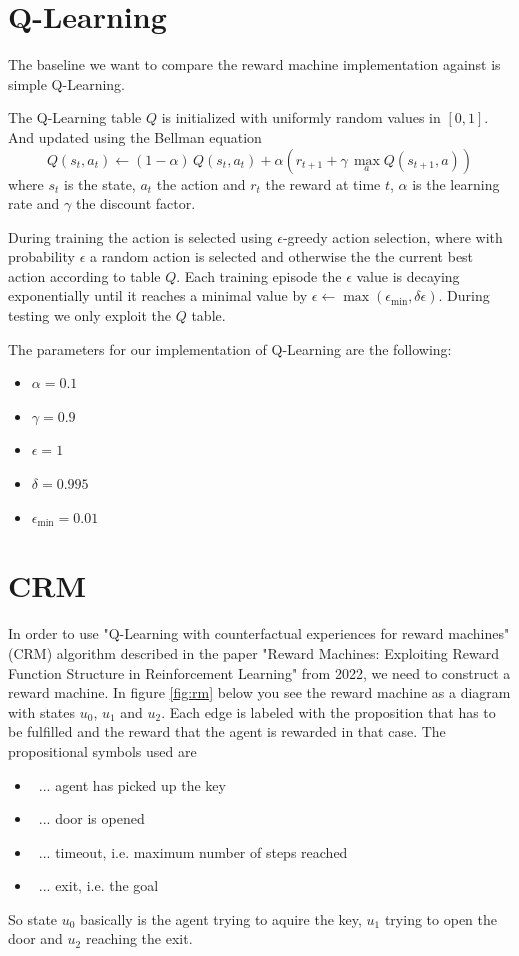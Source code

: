 \documentclass[12pt, a4paper]{article}
\begin{document}
\section*{Q-Learning}

The baseline we want to compare the reward machine implementation against is simple Q-Learning.

The Q-Learning table $Q$ is initialized with uniformly random values in $[0, 1]$. And updated using the Bellman equation
$$ Q(s_t, a_t) \leftarrow (1 - \alpha) \, Q(s_t, a_t) + \alpha \left( r_{t+1} + \gamma \, \max_a Q(s_{t+1}, a) \right) $$
where $s_t$ is the state, $a_t$ the action and $r_t$ the reward at time $t$, $\alpha$ is the learning rate and $\gamma$ the discount factor.

During training the action is selected using $\epsilon$-greedy action selection, where with probability $\epsilon$ a random action is selected and otherwise the the current best action according to table $Q$. Each training episode the $\epsilon$ value is decaying exponentially until it reaches a minimal value by $\epsilon \leftarrow \max(\epsilon_{\min}, \delta \epsilon)$. During testing we only exploit the $Q$ table.

The parameters for our implementation of Q-Learning are the following:
\begin{itemize}
	\item $\alpha = 0.1$
	\item $\gamma = 0.9$
	\item $\epsilon = 1$
	\item $\delta = 0.995$
	\item $\epsilon_{\min} = 0.01$
\end{itemize}

\section*{CRM}

In order to use "Q-Learning with counterfactual experiences for reward machines" (CRM) algorithm described in the paper "Reward Machines: Exploiting Reward Function Structure in Reinforcement Learning" from 2022, we need to construct a reward machine. In figure \ref{fig:rm} below you see the reward machine as a diagram with states $u_0$, $u_1$ and $u_2$. Each edge is labeled with the proposition that has to be fulfilled and the reward that the agent is rewarded in that case. The propositional symbols used are
\begin{itemize}
	\item \faKey\ ... agent has picked up the key
	\item \faDoorOpen\ ... door is opened
	\item \faClock\ ... timeout, i.e. maximum number of steps reached
	\item \faSignOut*\ ... exit, i.e. the goal
\end{itemize}
So state $u_0$ basically is the agent trying to aquire the key, $u_1$ trying to open the door and $u_2$ reaching the exit.
\end{document}
